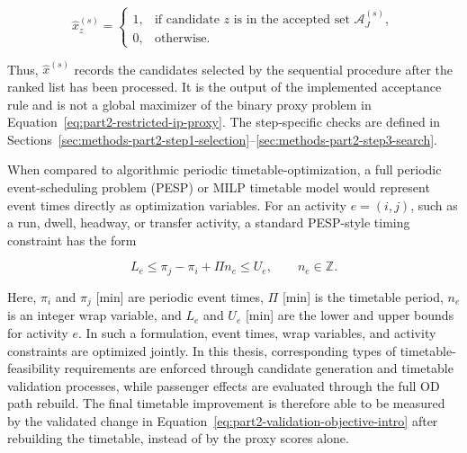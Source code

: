 \documentclass[preprint,12pt]{elsarticle}
\begin{document}
\begin{equation}
\widehat{x}^{(s)}_z
=
\begin{cases}
1, & \text{if candidate }z\text{ is in the accepted set }\mathcal{A}^{(s)}_J,\\
0, & \text{otherwise}.
\end{cases}
\label{eq:part2-selected-vector}
\end{equation}

Thus, \(\widehat{x}^{(s)}\) records the candidates selected by the sequential procedure after the ranked list has been processed. It is the output of the implemented acceptance rule and is not a global maximizer of the binary proxy problem in Equation~\eqref{eq:part2-restricted-ip-proxy}. The step-specific checks are defined in Sections~\ref{sec:methods-part2-step1-selection}--\ref{sec:methods-part2-step3-search}.

When compared to algorithmic periodic timetable-optimization, a full periodic event-scheduling problem (PESP) or MILP timetable model would represent event times directly as optimization variables. For an activity \(e=(i,j)\), such as a run, dwell, headway, or transfer activity, a standard PESP-style timing constraint has the form

\begin{equation}
L_e
\le
\pi_j-\pi_i+\Pi n_e
\le
U_e,
\qquad
n_e\in\mathbb{Z}.
\label{eq:part2-reference-pesp-constraint}
\end{equation}

Here, \(\pi_i\) and \(\pi_j\) [min] are periodic event times, \(\Pi\) [min] is the timetable period, \(n_e\) is an integer wrap variable, and \(L_e\) and \(U_e\) [min] are the lower and upper bounds for activity \(e\). In such a formulation, event times, wrap variables, and activity constraints are optimized jointly. In this thesis, corresponding types of timetable-feasibility requirements are enforced through candidate generation and timetable validation processes, while passenger effects are evaluated through the full OD path rebuild. The final timetable improvement is therefore able to be measured by the validated change in Equation~\eqref{eq:part2-validation-objective-intro} after rebuilding the timetable, instead of by the proxy scores alone.
\end{document}
